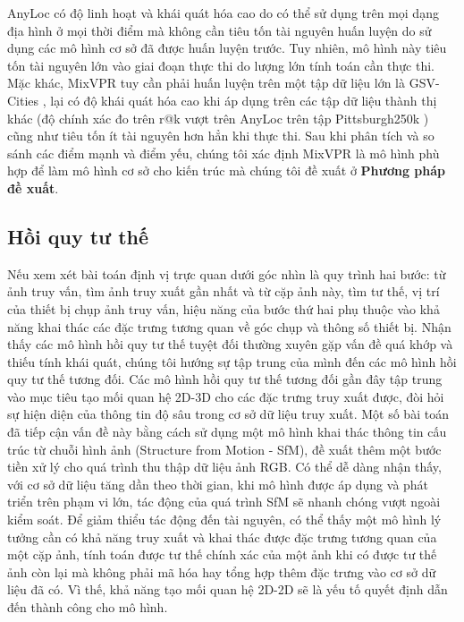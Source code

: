 AnyLoc \cite{keetha2023anyloc} có độ linh hoạt và khái quát hóa cao do có thể sử dụng trên mọi dạng địa hình ở mọi thời điểm mà không cần tiêu tốn tài nguyên huấn luyện do sử dụng các mô hình cơ sở đã được huấn luyện trước. Tuy nhiên, mô hình này tiêu tốn tài nguyên lớn vào giai đoạn thực thi do lượng lớn tính toán cần thực thi. Mặc khác, MixVPR \cite{alibey2023mixvpr} tuy cần phải huấn luyện trên một tập dữ liệu lớn là GSV-Cities \cite{Ali_bey_2022}, lại có độ khái quát hóa cao khi áp dụng trên các tập dữ liệu thành thị khác (độ chính xác đo trên r@k vượt trên AnyLoc trên tập Pittsburgh250k \cite{6618963}) cũng như tiêu tốn ít tài nguyên hơn hẳn khi thực thi. Sau khi phân tích và so sánh các điểm mạnh và điểm yếu, chúng tôi xác định MixVPR \cite{alibey2023mixvpr} là mô hình phù hợp để làm mô hình cơ sở cho kiến trúc mà chúng tôi đề xuất ở \textbf{Phương pháp đề xuất}.

\subsection*{Hồi quy tư thế}

Nếu xem xét bài toán định vị trực quan dưới góc nhìn là quy trình hai bước: từ ảnh truy vấn, tìm ảnh truy xuất gần nhất và từ cặp ảnh này, tìm tư thế, vị trí của thiết bị chụp ảnh truy vấn, hiệu năng của bước thứ hai phụ thuộc vào khả năng khai thác các đặc trưng tương quan về góc chụp và thông số thiết bị. Nhận thấy các mô hình hồi quy tư thế tuyệt đối thường xuyên gặp vấn đề quá khớp và thiếu tính khái quát, chúng tôi hướng sự tập trung của mình đến các mô hình hồi quy tư thế tương đối. Các mô hình hồi quy tư thế tương đối gần đây tập trung vào mục tiêu tạo mối quan hệ 2D-3D cho các đặc trưng truy xuất được, đòi hỏi sự hiện diện của thông tin độ sâu trong cơ sở dữ liệu truy xuất. Một số bài toán đã tiếp cận vấn đề này bằng cách sử dụng một mô hình khai thác thông tin cấu trúc từ chuỗi hình ảnh (Structure from Motion - SfM), đề xuất thêm một bước tiền xử lý cho quá trình thu thập dữ liệu ảnh RGB. Có thể dễ dàng nhận thấy, với cơ sở dữ liệu tăng dần theo thời gian, khi mô hình được áp dụng và phát triển trên phạm vi lớn, tác động của quá trình SfM sẽ nhanh chóng vượt ngoài kiểm soát. Để giảm thiểu tác động đến tài nguyên, có thể thấy một mô hình lý tưởng cần có khả năng truy xuất và khai thác được đặc trưng tương quan của một cặp ảnh, tính toán được tư thế chính xác của một ảnh khi có được tư thế ảnh còn lại mà không phải mã hóa hay tổng hợp thêm đặc trưng vào cơ sở dữ liệu đã có. Vì thế, khả năng tạo mối quan hệ 2D-2D sẽ là yếu tố quyết định dẫn đến thành công cho mô hình.

